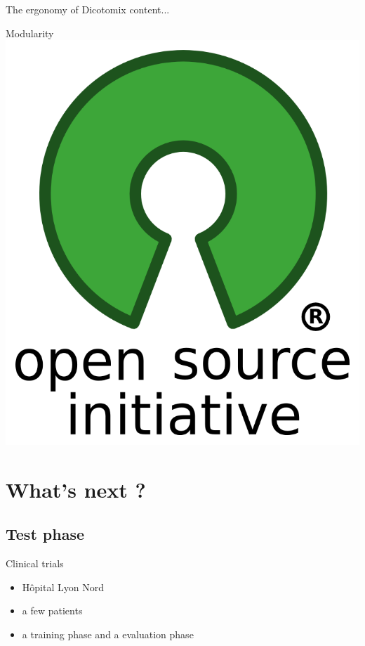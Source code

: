 \documentclass[graphics]{beamer}
\begin{document}
\begin{frame}{The ergonomy of Dicotomix}
	content...
\end{frame}

\begin{frame}{Modularity}
	\includegraphics[scale=0.1]{opensource}
\end{frame}

\section{What's next ?}
\subsection{Test phase}
\begin{frame}{Clinical trials}
	\begin{center}
		\begin{itemize}
			\item Hôpital Lyon Nord %
			\item a few patients
			\item a training phase and a evaluation phase %
		\end{itemize}
	\end{center}
\end{frame}
\end{document}
